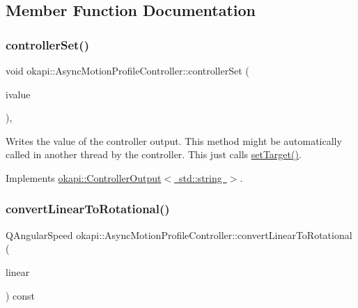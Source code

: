 \subsection{Member Function Documentation}
\mbox{\label{classokapi_1_1AsyncMotionProfileController_a292b22f53ed0ef67a479e00c92f68e3f}} 
\subsubsection{\texorpdfstring{controllerSet()}{controllerSet()}}
{\footnotesize\ttfamily void okapi\+::\+Async\+Motion\+Profile\+Controller\+::controller\+Set (\begin{DoxyParamCaption}\item[{std\+::string}]{ivalue }\end{DoxyParamCaption})\hspace{0.3cm}{\ttfamily [override]}, {\ttfamily [virtual]}}

Writes the value of the controller output. This method might be automatically called in another thread by the controller. This just calls {\ttfamily \mbox{\hyperlink{classokapi_1_1AsyncMotionProfileController_adf705d6bfd3d0a83d8a6c50a05ffd156}{set\+Target()}}}. 

Implements \mbox{\hyperlink{classokapi_1_1ControllerOutput_a360c08f0c10b36f882d6d3100c2cad49}{okapi\+::\+Controller\+Output$<$ std\+::string $>$}}.

\mbox{\label{classokapi_1_1AsyncMotionProfileController_a74b2981453d36e01c30b66c522bdcb52}} 
\subsubsection{\texorpdfstring{convertLinearToRotational()}{convertLinearToRotational()}}
{\footnotesize\ttfamily Q\+Angular\+Speed okapi\+::\+Async\+Motion\+Profile\+Controller\+::convert\+Linear\+To\+Rotational (\begin{DoxyParamCaption}\item[{Q\+Speed}]{linear }\end{DoxyParamCaption}) const\hspace{0.3cm}{\ttfamily [protected]}}

